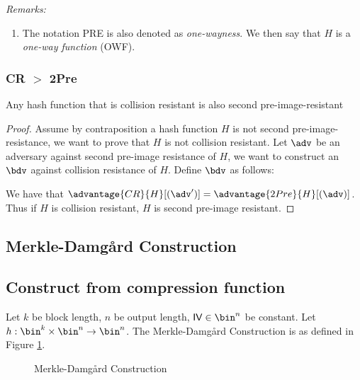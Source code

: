 \documentclass[11pt,a4paper]{article}
\begin{document}
\textit{Remarks:}
\begin{enumerate}
\item The notation PRE is also denoted as \textit{one-wayness}. We then say that $H$ is a \textit{one-way function} (OWF). 
\end{enumerate}







\subsubsection{CR $>$ 2Pre} Any hash function that is collision resistant is also second pre-image-resistant
\begin{proof}
Assume by contraposition a hash function $H$ is not second pre-image-resistance, we want to prove that $H$ is not collision resistant. Let $\adv$ be an adversary against second pre-image resistance of $H$, we want to construct an $\bdv$ against collision resistance of $H$. Define $\bdv$ as follows: 

\begin{pchstack}[ center , space=0.5cm]
\end{pchstack}
We have that $\advantage{CR}{H}[(\adv')] = \advantage{2Pre}{H}[(\adv)]$. Thus if $H$ is collision resistant, $H$ is second pre-image resistant. 

\end{proof}


\subsection{Merkle-Damgård Construction} 
\subsection{Construct from compression function}
Let $k$ be block length, $n$ be output length, $\textsf{IV} \in \bin^n$ be constant. Let $h: \bin^k \times \bin^n \rightarrow \bin^n$. The Merkle-Damgård Construction is as defined in Figure \ref{fig:md-construction}. 

\begin{figure}[H]
\begin{pchstack}[center , boxed, space=0.5cm]
\end{pchstack}
\caption{Merkle-Damgård Construction}
\label{fig:md-construction}
\end{figure}
\end{document}

